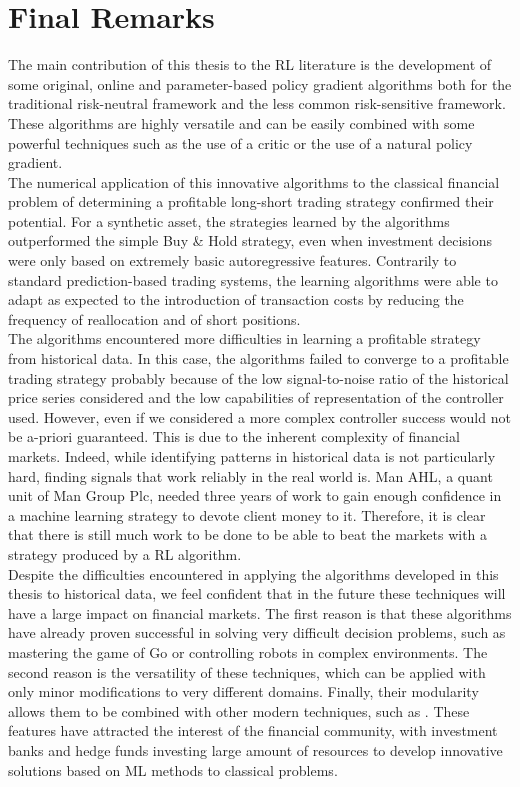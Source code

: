 \section{Final Remarks}
The main contribution of this thesis to the \gls{RL} literature is the development of some original, online and parameter-based policy gradient algorithms both for the traditional risk-neutral framework and the less common risk-sensitive framework. These algorithms are highly versatile and can be easily combined with some powerful techniques such as the use of a critic or the use of a natural policy gradient.\\
The numerical application of this innovative algorithms to the classical financial problem of determining a profitable long-short trading strategy confirmed their potential. For a synthetic asset, the strategies learned by the algorithms outperformed the simple Buy \& Hold strategy, even when investment decisions were only based on extremely basic autoregressive features. Contrarily to standard prediction-based trading systems, the learning algorithms were able to adapt as expected to the introduction of transaction costs by reducing the frequency of reallocation and of short positions.\\
The algorithms encountered more difficulties in learning a profitable strategy from historical data. In this case, the algorithms failed to converge to a profitable trading strategy probably because of the low signal-to-noise ratio of the historical price series considered and the low capabilities of representation of the controller used. However, even if we considered a more complex controller success would not be a-priori guaranteed. This is due to the inherent complexity of financial markets. Indeed, while identifying patterns in historical data is not particularly hard, finding signals that work reliably in the real world is. Man AHL, a quant unit of Man Group Plc, needed three years of work to gain enough confidence in a machine learning strategy to devote client money to it. Therefore, it is clear that there is still much work to be done to be able to beat the markets with a strategy produced by a \gls{RL}  algorithm.\\
Despite the difficulties encountered in applying the algorithms developed in this thesis to historical data, we feel confident that in the future these techniques will have a large impact on financial markets. The first reason is that these algorithms have already proven successful in solving very difficult decision problems, such as mastering the game of Go or controlling robots in complex environments. The second reason is the versatility of these techniques, which can be applied with only minor modifications to very different domains. Finally, their modularity allows them to be combined with other modern techniques, such as . These features have attracted the interest of the financial community, with investment banks and hedge funds investing large amount of resources to develop innovative solutions  based on \gls{ML} methods to classical problems. 
 
